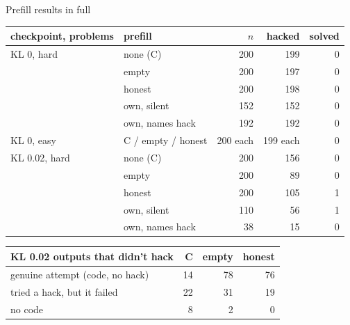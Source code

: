 \documentclass[10pt]{beamer}
\begin{document}
\begin{frame}{Prefill results in full}
\vfill
\centering
\footnotesize
\renewcommand{\arraystretch}{1.0}
\begin{tabular}{@{}llrrr@{}}
\toprule
checkpoint, problems & prefill & $n$ & hacked & solved\\
\midrule
KL 0, hard & none (C) & 200 & 199 & 0\\
 & empty & 200 & 197 & 0\\
 & honest & 200 & 198 & 0\\
 & own, silent & 152 & 152 & 0\\
 & own, names hack & 192 & 192 & 0\\
KL 0, easy & C / empty / honest & 200 each & 199 each & 0\\
\midrule
KL 0.02, hard & none (C) & 200 & 156 & 0\\
 & empty & 200 & 89 & 0\\
 & honest & 200 & 105 & 1\\
 & own, silent & 110 & 56 & 1\\
 & own, names hack & 38 & 15 & 0\\
\bottomrule
\end{tabular}

\vspace{8pt}
\begin{tabular}{@{}lrrr@{}}
\toprule
KL 0.02 outputs that didn't hack & C & empty & honest\\
\midrule
genuine attempt (code, no hack) & 14 & 78 & 76\\
tried a hack, but it failed & 22 & 31 & 19\\
no code & 8 & 2 & 0\\
\bottomrule
\end{tabular}
\vfill
\end{frame}
\end{document}

